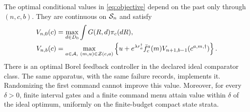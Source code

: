 \begin{theorem}\label{thm:control}
The optimal conditional values in \eqref{eq:objective} depend on the past
only through $(n,c,b)$. They are continuous on $\mathcal S_n$ and satisfy
\begin{align}
 V_{n,0}(c)&=\max_{d\in D_0}\int G(R,d)\pi_c(dR),\notag\\
 V_{n,b}(c)&=\max_{a\in\mathcal A,\ (m,u)\in\mathcal Z(c,a)}
 \left\{u+e^{\lambda r_a^\dagger}\bar f_c^a(m)
                         V_{n+1,b-1}(c^{a,m,\dagger})\right\}.
 \label{eq:bellman}
\end{align}
There is an optimal Borel feedback controller in the declared ideal
comparator class. The same apparatus, with the same failure records,
implements it. Randomizing the first command cannot improve this value.
Moreover, for every $\delta>0$, finite interval gates and a finite command
menu attain value within $\delta$ of the ideal optimum, uniformly on the
finite-budget compact state strata.
\end{theorem}
